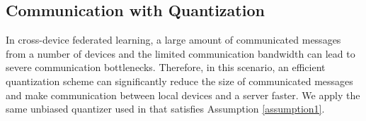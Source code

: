 \documentclass[11pt]{article}
\begin{document}

\subsection{Communication with Quantization}

In cross-device federated learning, a large amount of communicated messages from a number of devices and the limited communication bandwidth can lead to severe communication bottlenecks. Therefore, in this scenario, an efficient quantization scheme can significantly reduce the size of communicated messages and make communication between local devices and a server faster. We apply the same unbiased quantizer used in \cite{Yeojoon-haddadpour2021federated} that satisfies Assumption \ref{assumption1}.
\end{document}
